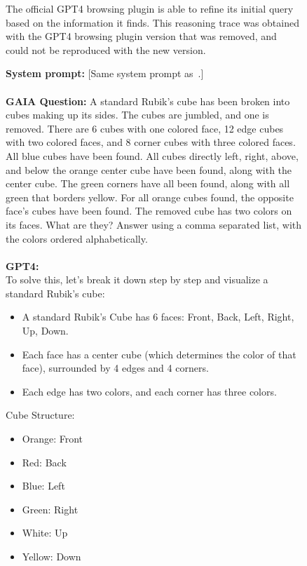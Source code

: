 \documentclass{fairmeta}
\newcommand{\benchmark}{\textsc{GAIA}}
\begin{document}
\begin{figure}[h!]
\begin{tcolorbox}[colframe=RoyalBlue, colback=white]
    \end{tcolorbox}
    \caption{The official GPT4 browsing plugin is able to refine its initial query based on the information it finds. This reasoning trace was obtained with the GPT4 browsing plugin version that was removed, and could not be reproduced with the new version.}
    \label{fig:demo_gpt4_goldfinger}
\end{figure}

\begin{figure}[h!]
    \small
    \centering
    \begin{tcolorbox}[colframe=RoyalBlue, colback=white]
    \textbf{System prompt:} [Same system prompt as~.]
    \\
    \\
    \textbf{\benchmark{} Question:} A standard Rubik's cube has been broken into cubes making up its sides. The cubes are jumbled, and one is removed. There are 6 cubes with one colored face, 12 edge cubes with two colored faces, and 8 corner cubes with three colored faces. All blue cubes have been found. All cubes directly left, right, above, and below the orange center cube have been found, along with the center cube. The green corners have all been found, along with all green that borders yellow. For all orange cubes found, the opposite face's cubes have been found. The removed cube has two colors on its faces. What are they? Answer using a comma separated list, with the colors ordered alphabetically.
    \\
    \\
    \textbf{GPT4:} 
    \\
    To solve this, let’s break it down step by step and visualize a standard Rubik's cube:
\begin{itemize}
    \item A standard Rubik’s Cube has 6 faces: Front, Back, Left, Right, Up, Down.
    \item Each face has a center cube (which determines the color of that face), surrounded by 4 edges and 4 corners.
    \item Each edge has two colors, and each corner has three colors.
\end{itemize}

Cube Structure:
\begin{itemize}
    \item Orange: Front
    \item Red: Back
    \item Blue: Left
    \item Green: Right
    \item White: Up
    \item Yellow: Down
\end{itemize}


\end{tcolorbox}
\end{figure}
\end{document}
